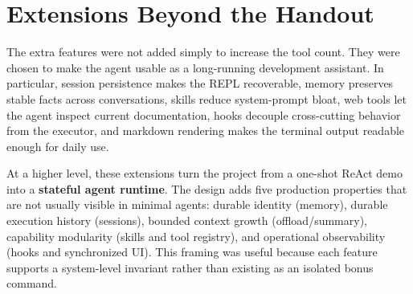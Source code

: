 \documentclass[11pt,a4paper]{article}
\begin{document}
\section{Extensions Beyond the Handout}

The extra features were not added simply to increase the tool count. They were
chosen to make the agent usable as a long-running development assistant. In
particular, session persistence makes the REPL recoverable, memory preserves
stable facts across conversations, skills reduce system-prompt bloat, web tools
let the agent inspect current documentation, hooks decouple cross-cutting
behavior from the executor, and markdown rendering makes the terminal output
readable enough for daily use.

At a higher level, these extensions turn the project from a one-shot ReAct
demo into a \textbf{stateful agent runtime}. The design adds five production
properties that are not usually visible in minimal agents: durable identity
(memory), durable execution history (sessions), bounded context growth
(offload/summary), capability modularity (skills and tool registry), and
operational observability (hooks and synchronized UI). This framing was useful
because each feature supports a system-level invariant rather than existing as
an isolated bonus command.
\end{document}
